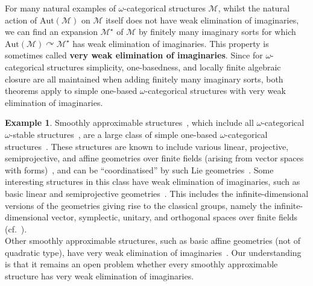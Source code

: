 \documentclass{article}
\theoremstyle{remark}
\theoremstyle{definition}
\newtheorem{example}[theorem]{Example}
\def\acts{\curvearrowright}
\newcommand{\M}[0]{\mathcal{M}}
\begin{document}
{{{{{For many natural examples of $\omega$-categorical structures $\mathcal{M}$, whilst the natural action of $\mathrm{Aut}(\M)$ on $\mathcal{M}$ itself does not have weak elimination of imaginaries, we can find an expansion $\mathcal{M}^\star$ of $\mathcal{M}$ by finitely many imaginary sorts for which $\mathrm{Aut}(\M)\acts\mathcal{M}^\star$ has weak elimination of imaginaries. This property is sometimes called \textbf{very weak elimination of imaginaries}. Since for $\omega$-categorical structures simplicity, one-basedness, and locally finite algebraic closure are all maintained when adding finitely many imaginary sorts, both theorems apply to simple one-based $\omega$-categorical structures with very weak elimination of imaginaries. %



\begin{example} %
Smoothly approximable structures~\cite{cherlin2003finite}, which include all $\omega$-categorical $\omega$-stable structures~\cite{cherlin1985}, are a large class of simple one-based $\omega$-categorical structures~\cite[Proposition 5.5.2]{cherlin2003finite}. These structures are known to include various linear, projective, semiprojective, and affine geometries over finite fields (arising from vector spaces with forms)~\cite[Definitions 2.1.4, 2.1.7, and 2.1.8]{cherlin2003finite}, and  can be ``coordinatised'' by such Lie geometries~\cite[Theorem 2]{cherlin2003finite}. Some interesting structures in this class have weak elimination of imaginaries, such as basic linear and semiprojective geometries~\cite[Lemmas 2.3.5 and 2.3.6]{cherlin2003finite}.
This includes the infinite-dimensional versions of the geometries giving rise to the classical groups, namely the infinite-dimensional vector,  symplectic, unitary, and orthogonal spaces over finite fields %
(cf.~\cite{evans1991small}). \\
{Other smoothly approximable structures, such as basic affine geometries (not of quadratic type), have %
very weak elimination of imaginaries~\cite[Lemma 2.3.12]{cherlin2003finite}.
Our understanding is that it remains an open problem whether every smoothly approximable structure has very weak elimination of imaginaries.}%
\end{example}

}}}}}
\end{document}
